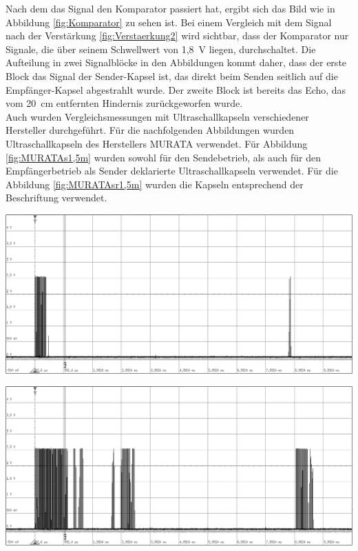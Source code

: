 Nach dem das Signal den Komparator passiert hat, ergibt sich das Bild wie in Abbildung \ref{fig:Komparator} zu sehen ist. Bei einem Vergleich mit dem Signal nach der Verstärkung \ref{fig:Verstaerkung2} wird sichtbar, dass der Komparator nur Signale, die über seinem Schwellwert von 1,8~V liegen, durchschaltet. Die Aufteilung in zwei Signalblöcke in den Abbildungen kommt daher, dass der erste Block das Signal der Sender-Kapsel ist, das direkt beim Senden seitlich auf die Empfänger-Kapsel abgestrahlt wurde. Der zweite Block ist bereits das Echo, das vom 20~cm entfernten Hindernis zurückgeworfen wurde.\\
Auch wurden Vergleichsmessungen mit Ultraschallkapseln verschiedener Hersteller durchgeführt. Für die nachfolgenden Abbildungen wurden  Ultraschallkapseln des Herstellers MURATA verwendet. Für Abbildung \ref{fig:MURATAs1,5m} wurden sowohl für den Sendebetrieb, als auch für den Empfängerbetrieb als Sender deklarierte Ultraschallkapseln verwendet. Für die Abbildung \ref{fig:MURATAsr1,5m} wurden die Kapseln entsprechend der Beschriftung verwendet.\\
\begin{minipage}{0.46\textwidth}
\includegraphics[width=1\textwidth%
]{Abbildungen/MessungenP1/MURATAs1,5m.png}
\label{fig:MURATAs1,5m}
\end{minipage}\qquad
\begin{minipage}{0.46\textwidth}
\includegraphics[width=1\textwidth%
]{Abbildungen/MessungenP1/MURATAsr1,5m.png}
\label{fig:MURATAsr1,5m}
\end{minipage}\\
